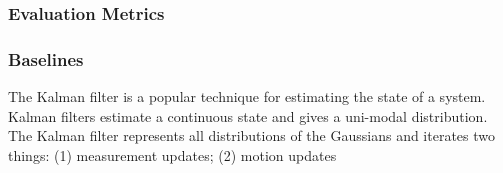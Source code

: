 \documentclass[10pt,twocolumn,letterpaper]{article}
\begin{document}
%
%
%
\subsubsection{Evaluation Metrics}


\subsubsection{Baselines}
The Kalman filter is a popular technique for estimating the state of a system. Kalman filters estimate a continuous state and gives a uni-modal distribution. The Kalman filter represents all distributions of the Gaussians and iterates two things: (1) measurement updates; (2) motion updates
\end{document}
